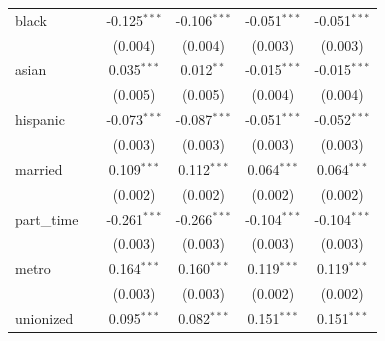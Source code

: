 \begin{tabular}{lccccc}
   black                                        &                         & -0.125$^{***}$          & -0.106$^{***}$          & -0.051$^{***}$          & -0.051$^{***}$\\   
                                                &                         & (0.004)                 & (0.004)                 & (0.003)                 & (0.003)\\   
   asian                                        &                         & 0.035$^{***}$           & 0.012$^{**}$            & -0.015$^{***}$          & -0.015$^{***}$\\   
                                                &                         & (0.005)                 & (0.005)                 & (0.004)                 & (0.004)\\   
   hispanic                                     &                         & -0.073$^{***}$          & -0.087$^{***}$          & -0.051$^{***}$          & -0.052$^{***}$\\   
                                                &                         & (0.003)                 & (0.003)                 & (0.003)                 & (0.003)\\   
   married                                      &                         & 0.109$^{***}$           & 0.112$^{***}$           & 0.064$^{***}$           & 0.064$^{***}$\\   
                                                &                         & (0.002)                 & (0.002)                 & (0.002)                 & (0.002)\\   
   part\_time                                   &                         & -0.261$^{***}$          & -0.266$^{***}$          & -0.104$^{***}$          & -0.104$^{***}$\\   
                                                &                         & (0.003)                 & (0.003)                 & (0.003)                 & (0.003)\\   
   metro                                        &                         & 0.164$^{***}$           & 0.160$^{***}$           & 0.119$^{***}$           & 0.119$^{***}$\\   
                                                &                         & (0.003)                 & (0.003)                 & (0.002)                 & (0.002)\\   
   unionized                                    &                         & 0.095$^{***}$           & 0.082$^{***}$           & 0.151$^{***}$           & 0.151$^{***}$\\   

\end{tabular}
